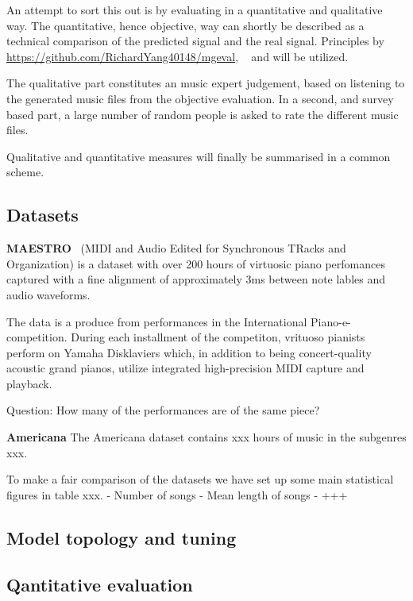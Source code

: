 \documentclass{IEEEtran}
\begin{document}
        An attempt to sort this out is by evaluating in a quantitative and qualitative way.
        The quantitative, hence objective, way can shortly be described as a technical
        comparison of the predicted signal and the real signal. Principles by
        \url{https://github.com/RichardYang40148/mgeval}, ~\cite{wu2020jazz} and
         will be utilized.
        
        The qualitative part constitutes an music expert judgement,
        based on listening to the generated music files from the objective evaluation.
        In a second, and survey based part, a large number of random people is asked
        to rate the different music files.
        
        Qualitative and quantitative measures will finally be summarised in a common scheme.
        
    \subsection{Datasets}

    \textbf{MAESTRO}~\cite{maestrodataset}
    (MIDI and Audio Edited for Synchronous TRacks and Organization)
    is a dataset with over 200 hours of virtuosic piano perfomances captured with 
    a fine alignment of approximately 3ms between note lables and audio waveforms.

    The data is a produce from performances in the International Piano-e-competition.
    During each installment of the competiton, vrituoso pianists perform on Yamaha
    Disklaviers which, in addition to being concert-quality acoustic grand pianos,
    utilize integrated high-precision MIDI capture and playback.

    

    Question: How many of the performances are of the same piece?

    \textbf{Americana}
    The Americana dataset contains xxx hours of music in the subgenres xxx.
    
    To make a fair comparison of the datasets we have set up some main statistical figures in table xxx.
    - Number of songs
    - Mean length of songs
    - +++

    \subsection{Model topology and tuning}
    
    \subsection{Qantitative evaluation}
    
\end{document}
